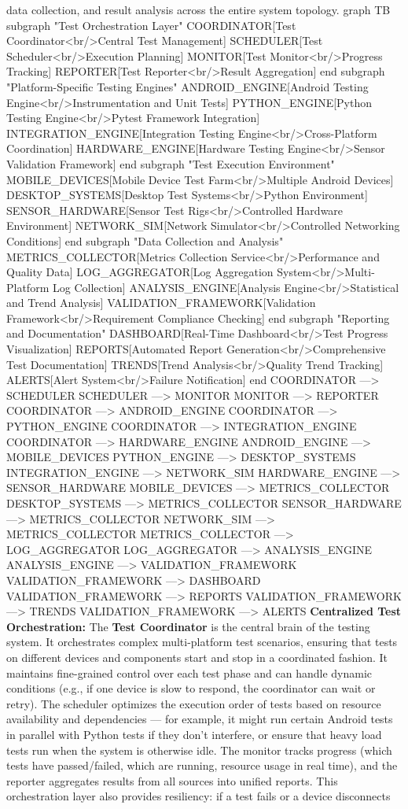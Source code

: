 data collection, and result analysis across the entire system topology. graph TB subgraph "Test Orchestration Layer" COORDINATOR[Test Coordinator<br/>Central Test Management] SCHEDULER[Test Scheduler<br/>Execution Planning] MONITOR[Test Monitor<br/>Progress Tracking] REPORTER[Test Reporter<br/>Result Aggregation] end subgraph "Platform-Specific Testing Engines" ANDROID_ENGINE[Android Testing Engine<br/>Instrumentation and Unit Tests] PYTHON_ENGINE[Python Testing Engine<br/>Pytest Framework Integration] INTEGRATION_ENGINE[Integration Testing Engine<br/>Cross-Platform Coordination] HARDWARE_ENGINE[Hardware Testing Engine<br/>Sensor Validation Framework] end subgraph "Test Execution Environment" MOBILE_DEVICES[Mobile Device Test Farm<br/>Multiple Android Devices] DESKTOP_SYSTEMS[Desktop Test Systems<br/>Python Environment] SENSOR_HARDWARE[Sensor Test Rigs<br/>Controlled Hardware Environment] NETWORK_SIM[Network Simulator<br/>Controlled Networking Conditions] end subgraph "Data Collection and Analysis" METRICS_COLLECTOR[Metrics Collection Service<br/>Performance and Quality Data] LOG_AGGREGATOR[Log Aggregation System<br/>Multi-Platform Log Collection] ANALYSIS_ENGINE[Analysis Engine<br/>Statistical and Trend Analysis] VALIDATION_FRAMEWORK[Validation Framework<br/>Requirement Compliance Checking] end subgraph "Reporting and Documentation" DASHBOARD[Real-Time Dashboard<br/>Test Progress Visualization] REPORTS[Automated Report Generation<br/>Comprehensive Test Documentation] TRENDS[Trend Analysis<br/>Quality Trend Tracking] ALERTS[Alert System<br/>Failure Notification] end COORDINATOR ---> SCHEDULER SCHEDULER ---> MONITOR MONITOR ---> REPORTER COORDINATOR ---> ANDROID_ENGINE COORDINATOR ---> PYTHON_ENGINE COORDINATOR ---> INTEGRATION_ENGINE COORDINATOR ---> HARDWARE_ENGINE ANDROID_ENGINE ---> MOBILE_DEVICES PYTHON_ENGINE ---> DESKTOP_SYSTEMS INTEGRATION_ENGINE ---> NETWORK_SIM HARDWARE_ENGINE ---> SENSOR_HARDWARE MOBILE_DEVICES ---> METRICS_COLLECTOR DESKTOP_SYSTEMS ---> METRICS_COLLECTOR SENSOR_HARDWARE ---> METRICS_COLLECTOR NETWORK_SIM ---> METRICS_COLLECTOR METRICS_COLLECTOR ---> LOG_AGGREGATOR LOG_AGGREGATOR ---> ANALYSIS_ENGINE ANALYSIS_ENGINE ---> VALIDATION_FRAMEWORK VALIDATION_FRAMEWORK ---> DASHBOARD VALIDATION_FRAMEWORK ---> REPORTS VALIDATION_FRAMEWORK ---> TRENDS VALIDATION_FRAMEWORK ---> ALERTS \textbf{Centralized Test Orchestration:} The \textbf{Test Coordinator} is the central brain of the testing system. It orchestrates complex multi-platform test scenarios, ensuring that tests on different devices and components start and stop in a coordinated fashion. It maintains fine-grained control over each test phase and can handle dynamic conditions (e.g., if one device is slow to respond, the coordinator can wait or retry). The scheduler optimizes the execution order of tests based on resource availability and dependencies --- for example, it might run certain Android tests in parallel with Python tests if they don't interfere, or ensure that heavy load tests run when the system is otherwise idle. The monitor tracks progress (which tests have passed/failed, which are running, resource usage in real time), and the reporter aggregates results from all sources into unified reports. This orchestration layer also provides resiliency: if a test fails or a device disconnects 